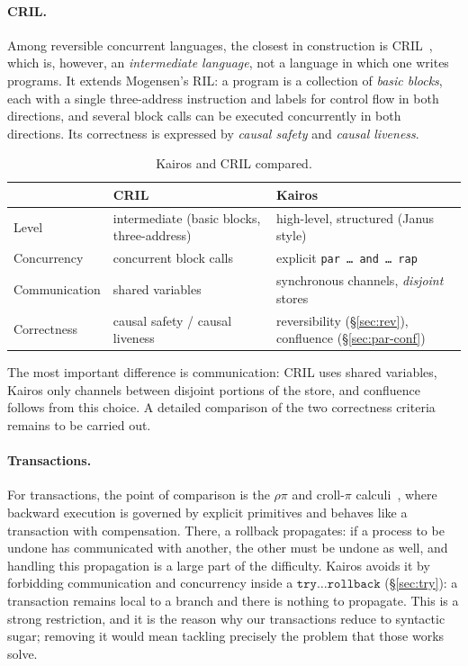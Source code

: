 \paragraph{CRIL.} Among reversible concurrent languages, the closest in
construction is CRIL~\cite{OguchiYuen2024}, which is, however, an \emph{intermediate
language}, not a language in which one writes programs. It extends Mogensen's RIL: a
program is a collection of \emph{basic blocks}, each with a single
three-address instruction and labels for control flow in both
directions, and several block calls can be executed concurrently in
both directions. Its correctness is expressed by \emph{causal safety} and
\emph{causal liveness}.

\begin{table}[H]
\centering
\renewcommand{\arraystretch}{1.25}
\small
\begin{tabular}{l l l}
\hline
 & \textbf{CRIL}~\cite{OguchiYuen2024} & \textbf{Kairos}\\
\hline
Level & intermediate (basic blocks, three-address) & high-level, structured (Janus style)\\
Concurrency & concurrent block calls & explicit \texttt{par\,\dots\,and\,\dots\,rap}\\
Communication & shared variables & synchronous channels, \emph{disjoint} stores\\
Correctness & causal safety / causal liveness & reversibility (\S\ref{sec:rev}), confluence (\S\ref{sec:par-conf})\\
\hline
\end{tabular}
\caption{Kairos and CRIL compared.}
\label{tab:cril}
\end{table}

\noindent
The most important difference is communication: CRIL uses shared variables,
Kairos only channels between disjoint portions of the store, and confluence
follows from this choice. A detailed comparison of the two correctness criteria
remains to be carried out.

\paragraph{Transactions.} For transactions, the point of comparison is the
$\rho\pi$ and croll-$\pi$ calculi~\cite{LaneseMezzinaSchmittStefani2011,%
LaneseLienhardtMezzinaSchmittStefani2013}, where backward execution is
governed by explicit primitives and behaves like a transaction with
compensation. There, a rollback propagates: if a process to be undone has
communicated with another, the other must be undone as well, and handling this
propagation is a large part of the difficulty. Kairos avoids it by forbidding
communication and concurrency inside a $\mathtt{try}\ldots\mathtt{rollback}$
(\S\ref{sec:try}): a transaction remains local to a branch and there is nothing
to propagate. This is a strong restriction, and it is the reason why our transactions
reduce to syntactic sugar; removing it would mean tackling precisely the
problem that those works solve.


